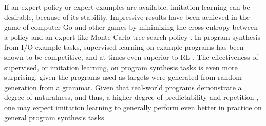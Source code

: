 \documentclass{article}
\begin{document}
If an expert policy or expert examples are available, imitation learning can be desirable, because of its stability. Impressive results have been achieved in the game of computer Go and other games by minimizing the cross-entropy between a policy and an expert-like Monte Carlo tree search policy \cite{silver2017mastering}. In program synthesis from I/O example tasks, supervised learning on example programs has been shown to be competitive, and at times even superior to RL \cite{bunel2018leveraging}. The effectiveness of supervised, or imitation learning, on program synthesis tasks is even more surprising, given the programs used as targets were generated from random generation from a grammar. Given that real-world programs demonstrate a degree of naturalness, and thus, a higher degree of predictability and repetition \cite{hindle2012naturalness}, one may expect imitation learning to generally perform even better in practice on general program synthesis tasks. 

\end{document}
